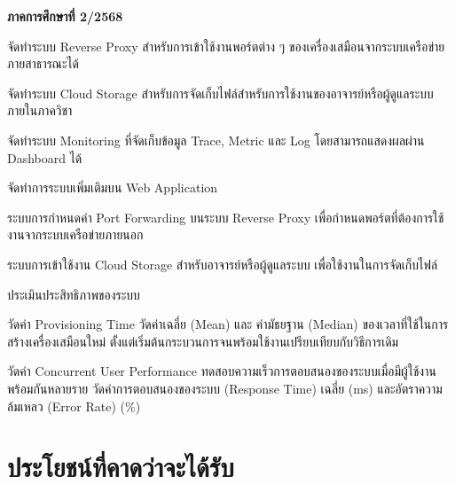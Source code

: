 \hspace*{1 cm}\textbf{ภาคการศึกษาที่ 2/2568}
\begin{mycustomenum2}
    \item จัดทำระบบ Reverse Proxy สำหรับการเข้าใช้งานพอร์ตต่าง ๆ ของเครื่องเสมือนจากระบบเครือข่ายภายสาธารณะได้
    \item จัดทำระบบ Cloud Storage สำหรับการจัดเก็บไฟล์สำหรับการใช้งานของอาจารย์หรือผู้ดูแลระบบภายในภาควิชา
    \item จัดทำระบบ Monitoring ที่จัดเก็บข้อมูล Trace, Metric และ Log โดยสามารถแสดงผลผ่าน Dashboard ได้
    \item จัดทำการระบบเพิ่มเติมบน Web Application
    \begin{mycustomenum2}
        \item ระบบการกำหนดค่า Port Forwarding บนระบบ Reverse Proxy เพื่อกำหนดพอร์ตที่ต้องการใช้งานจากระบบเครือข่ายภายนอก
        \item ระบบการเข้าใช้งาน Cloud Storage สำหรับอาจารย์หรือผู้ดูแลระบบ เพื่อใช้งานในการจัดเก็บไฟล์
    \end{mycustomenum2}
    \item ประเมินประสิทธิภาพของระบบ
    \begin{mycustomenum2}
        \item วัดค่า Provisioning Time วัดค่าเฉลี่ย (Mean) และ ค่ามัธยฐาน (Median) ของเวลาที่ใช้ในการสร้างเครื่องเสมือนใหม่ ตั้งแต่เริ่มต้นกระบวนการจนพร้อมใช้งานเปรียบเทียบกับวิธีการเดิม
        \item วัดค่า Concurrent User Performance ทดสอบความเร็วการตอบสนองของระบบเมื่อมีผู้ใช้งานพร้อมกันหลายราย วัดค่าการตอบสนองของระบบ (Response Time) เฉลี่ย (ms) และอัตราความล้มเหลว (Error Rate) (\%)
    \end{mycustomenum2}
\end{mycustomenum2}



\section{ประโยชน์ที่คาดว่าจะได้รับ}

